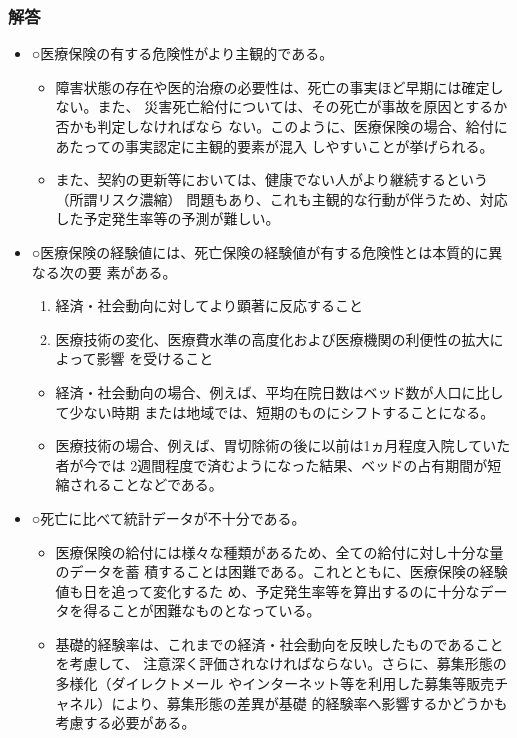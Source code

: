 \documentclass[report,gutter=10mm,fore-edge=10mm,uplatex,dvipdfmx]{jlreq}
\begin{document}
\subsubsection{解答}
\begin{itemize}
 \item ○医療保険の有する危険性がより主観的である。
\begin{itemize}
 \item 障害状態の存在や医的治療の必要性は、死亡の事実ほど早期には確定しない。また、
災害死亡給付については、その死亡が事故を原因とするか否かも判定しなければなら
ない。このように、医療保険の場合、給付にあたっての事実認定に主観的要素が混入
しやすいことが挙げられる。
 \item また、契約の更新等においては、健康でない人がより継続するという（所謂リスク濃縮）
問題もあり、これも主観的な行動が伴うため、対応した予定発生率等の予測が難しい。
\end{itemize}
 \item ○医療保険の経験値には、死亡保険の経験値が有する危険性とは本質的に異なる次の要
素がある。
\begin{enumerate}
 \item 経済・社会動向に対してより顕著に反応すること
 \item 医療技術の変化、医療費水準の高度化および医療機関の利便性の拡大によって影響
を受けること
\end{enumerate}
\begin{itemize}
 \item 経済・社会動向の場合、例えば、平均在院日数はベッド数が人口に比して少ない時期
または地域では、短期のものにシフトすることになる。
 \item 医療技術の場合、例えば、胃切除術の後に以前は1ヵ月程度入院していた者が今では
2週間程度で済むようになった結果、ベッドの占有期間が短縮されることなどである。
\end{itemize}
 \item ○死亡に比べて統計データが不十分である。
\begin{itemize}
 \item 医療保険の給付には様々な種類があるため、全ての給付に対し十分な量のデータを蓄
積することは困難である。これとともに、医療保険の経験値も日を追って変化するた
め、予定発生率等を算出するのに十分なデータを得ることが困難なものとなっている。
 \item 基礎的経験率は、これまでの経済・社会動向を反映したものであることを考慮して、
注意深く評価されなければならない。さらに、募集形態の多様化（ダイレクトメール
やインターネット等を利用した募集等販売チャネル）により、募集形態の差異が基礎
的経験率へ影響するかどうかも考慮する必要がある。
\end{itemize}
\end{itemize}
\end{document}
